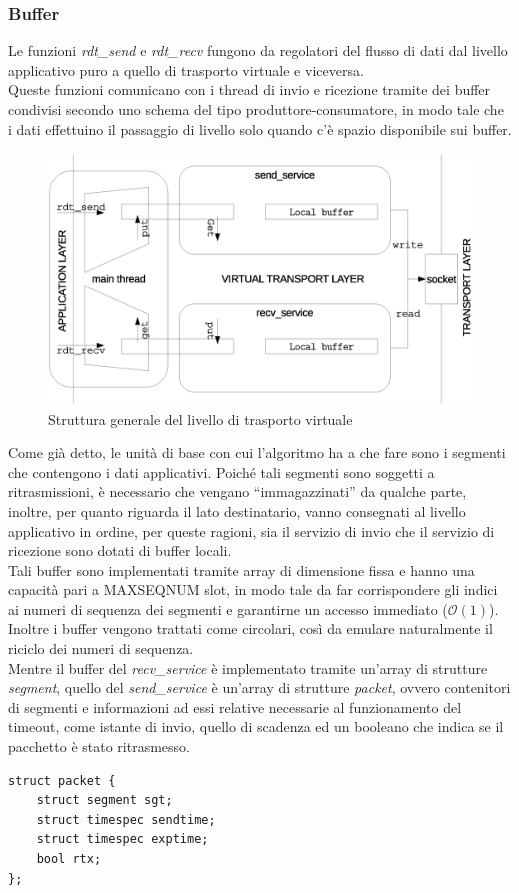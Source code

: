\subsubsection{Buffer}
Le funzioni \emph{rdt\_send} e \emph{rdt\_recv} fungono da regolatori del flusso
di dati dal livello applicativo puro a quello di trasporto virtuale e 
viceversa.\\
Queste funzioni comunicano con i thread di invio e ricezione tramite 
dei buffer condivisi secondo uno schema del tipo produttore-consumatore, in 
modo tale che i dati effettuino il passaggio di livello solo quando c'è spazio
disponibile sui buffer.
%
\begin{figure}[!h]
\includegraphics[scale=0.35]{images/structure_1}
\caption{Struttura generale del livello di trasporto virtuale}
\end{figure}
%
Come già detto, le unità di base con cui l'algoritmo ha a che fare sono
i segmenti che contengono i dati applicativi. Poiché tali segmenti sono
soggetti a ritrasmissioni, è necessario che vengano ``immagazzinati'' da 
qualche parte, inoltre, per quanto riguarda il lato destinatario, vanno
consegnati al livello applicativo in ordine, per queste ragioni, sia il 
servizio di invio che il servizio di ricezione sono dotati di buffer locali.\\
Tali buffer sono implementati tramite array di dimensione fissa e hanno una
capacità pari a MAXSEQNUM slot, in modo tale da far
corrispondere gli indici ai numeri di sequenza dei segmenti e 
garantirne un accesso immediato ($\mathcal{O}(1)$). Inoltre i buffer vengono
trattati come circolari, così da emulare naturalmente il riciclo dei numeri 
di sequenza.\\
Mentre il buffer del \emph{recv\_service} è implementato tramite un'array di 
strutture \emph{segment}, quello del \emph{send\_service} è un'array di 
strutture \emph{packet}, ovvero contenitori di segmenti e informazioni ad essi
relative necessarie al funzionamento del timeout, come istante di invio, quello
di scadenza ed un booleano che indica se il pacchetto è stato ritrasmesso.
%
\begin{lstlisting}[title=transport.h]
struct packet {
	struct segment sgt;
	struct timespec sendtime;
	struct timespec exptime;
	bool rtx;
};
\end{lstlisting}
